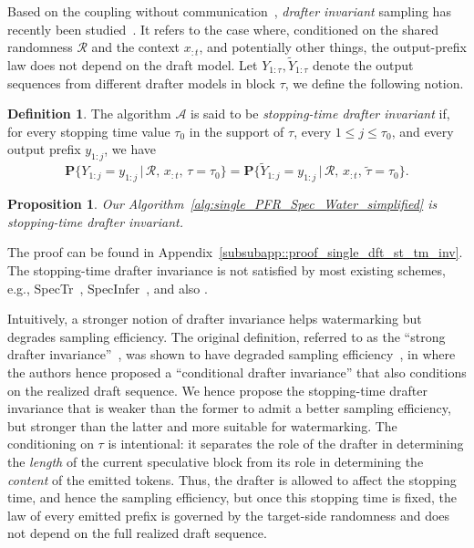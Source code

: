 \documentclass{article}
\theoremstyle{plain}
\newtheorem{proposition}[theorem]{Proposition}
\theoremstyle{definition}
\newtheorem{definition}[theorem]{Definition}
\begin{document}
Based on the coupling without communication~\citep{bavarian2016optimality, li2018strong}, \emph{drafter invariant} sampling has recently been studied~\citep{daliri2025coupling}. It %
refers to the case where, conditioned on the shared randomness $\mathcal R$ and the context $x_{:t}$, and potentially other things, the output-prefix law does not depend on the draft model. 
Let $Y_{1:\tau}, \widetilde{Y}_{1:\tau}$ denote the output sequences from different drafter models in block $\tau$, we define the following notion. 


\begin{definition}
\label{def:st_tm_drafter_invariance_single}
The algorithm $\mathcal{A}$ is said to be \emph{stopping-time drafter invariant} if, for every stopping time value $\tau_0$ in the support of $\tau$, every $1\le j\le \tau_0$, and every output prefix $y_{1:j}$, we have
\begin{equation*}
\mathbf{P}\big\{
Y_{1:j}=y_{1:j}\,\big|\,\mathcal{R},\,x_{:t},\,\tau=\tau_0
\big\}
=
\mathbf{P}\big\{
\widetilde{Y}_{1:j}=y_{1:j}\,\big|\,\mathcal{R},\,x_{:t},\,\widetilde{\tau}=\tau_0
\big\}.
\end{equation*}
\end{definition}

\begin{proposition} 
\label{prop::single_dft_st_tm_inv} 
Our Algorithm~\ref{alg:single_PFR_Spec_Water_simplified} is stopping-time drafter invariant. 
\end{proposition}

The proof can be found in Appendix~\ref{subsubapp::proof_single_dft_st_tm_inv}. 
The stopping-time drafter invariance is not satisfied by most existing schemes, e.g., SpecTr~\citep{sun2023spectr}, SpecInfer~\citep{miao2024specinfer}, and also \citep[Algorithm 2]{rowan2025list}. 




{\color{teal}
Intuitively, a stronger notion of drafter invariance helps watermarking but degrades sampling efficiency. 
The original definition, referred to as the ``strong drafter invariance''~\citep{daliri2025coupling}, was shown to have degraded sampling efficiency~\citep{rowan2025list}, in where the authors hence proposed a ``conditional drafter invariance'' that also conditions on the realized draft sequence. 
We hence propose the stopping-time drafter invariance that is weaker than the former to admit a better sampling efficiency, but stronger than the latter and more suitable for watermarking. 
The conditioning on $\tau$ is intentional: it separates the role of the drafter in determining the \emph{length} of the current speculative block from its role in determining the \emph{content} of the emitted tokens. 
Thus, the drafter is allowed to affect the stopping time, and hence the sampling efficiency, but once this stopping time is fixed, the law of every emitted prefix is governed by the target-side randomness and does not depend on the full realized draft sequence. 
}
\end{document}
